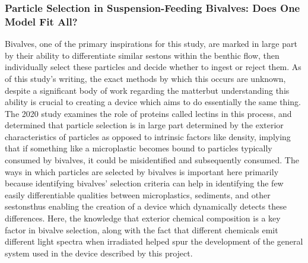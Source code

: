 \documentclass[fleqn,10pt]{SelfArx} %
\begin{document}
	\subsubsection*{Particle Selection in Suspension-Feeding Bivalves: Does One Model Fit All?}
	
	Bivalves, one of the primary inspirations for this study, are marked in large part by their ability to differentiate similar sestons within the benthic flow, then individually select these particles and decide whether to ingest or reject them. As of this study’s writing, the exact methods by which this occurs are unknown, despite a significant body of work regarding the matter\textemdash but understanding this ability is crucial to creating a device which aims to do essentially the same thing. The 2020 study examines the role of proteins called lectins in this process, and determined that particle selection is in large part determined by the exterior characteristics of particles as opposed to intrinsic factors like density, implying that if something like a microplastic becomes bound to particles typically consumed by bivalves, it could be misidentified and subsequently consumed. 
	The ways in which particles are selected by bivalves is important here primarily because identifying bivalves’ selection criteria can help in identifying the few easily differentiable qualities between microplastics, sediments, and other sestons\textemdash thus enabling the creation of a device which dynamically detects these differences. Here, the knowledge that exterior chemical composition is a key factor in bivalve selection, along with the fact that different chemicals emit different light spectra when irradiated helped spur the development of the general system used in the device described by this project.
	
\end{document}
